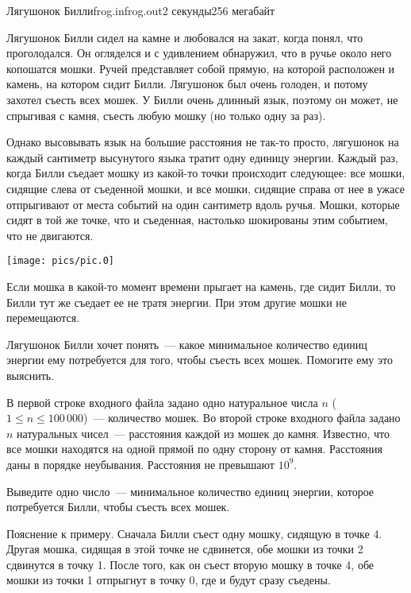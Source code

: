 \begin{problem}{Лягушонок Билли}{frog.in}{frog.out}{2 секунды}{256 мегабайт}


Лягушонок Билли сидел на камне и любовался на закат, когда понял, что проголодался. Он огляделся и
с удивлением обнаружил, что в ручье около него копошатся мошки. Ручей представляет собой прямую,
на которой расположен и камень, на котором сидит Билли.
Лягушонок был очень голоден, и потому захотел съесть всех мошек. У Билли очень длинный язык, поэтому
он может, не спрыгивая с камня, съесть любую мошку (но только одну за раз). 

Однако высовывать язык на большие расстояния не так-то просто, лягушонок на каждый сантиметр высунутого языка 
тратит одну единицу энергии. Каждый раз, когда Билли съедает мошку из какой-то точки происходит следующее:
все мошки, сидящие слева от съеденной мошки, и все мошки, сидящие справа от нее
в ужасе отпрыгивают от места событий на один сантиметр вдоль ручья.
Мошки, которые сидят в той же точке, что и съеденная, настолько шокированы этим событием, что не двигаются. 

\begin{center}
	\texttt{[image: pics/pic.0]}
\end{center}

Если мошка в какой-то момент времени прыгает на камень, где сидит Билли, то Билли тут же съедает ее не тратя энергии.
При этом другие мошки не перемещаются.

Лягушонок Билли хочет понять~--- какое минимальное количество единиц энергии ему потребуется для того, 
чтобы съесть всех мошек. Помогите ему это выяснить.

\InputFile
В первой строке входного файла задано одно натуральное числа $n$ ($1 \le n \le 100{\,}000$)~--- количество мошек.
Во второй строке входного файла задано $n$ натуральных чисел~--- расстояния каждой из мошек до камня. Известно,
что все мошки находятся на одной прямой по одну сторону от камня. Расстояния даны в порядке неубывания.
Расстояния не превышают $10^9$.

\OutputFile
Выведите одно число~--- минимальное количество единиц энергии, которое потребуется Билли, 
чтобы съесть всех мошек.

\Examples
\begin{example}%
%
\end{example}

\Note
Пояснение к примеру. Сначала Билли съест одну мошку, сидящую в точке 4. 
Другая мошка, сидящая в этой точке не сдвинется, обе мошки из точки 2 сдвинутся 
в точку 1. После того, как он съест вторую мошку в точке 4, обе мошки из 
точки 1 отпрыгнут в точку 0, где и будут сразу съедены.

\end{problem}
